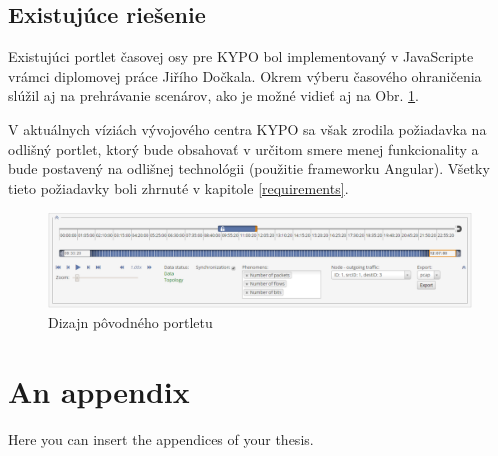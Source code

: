 \documentclass[
  digital, %
  twoside, %
  notable,   %
  nolof,   %
  nolot,   %
]{fithesis3}
\begin{document}
\section{Existujúce riešenie}
Existujúci portlet časovej osy pre KYPO bol implementovaný v JavaScripte vrámci diplomovej práce Jiřího Dočkala\cite{dockal2016webovy}. Okrem výberu časového ohraničenia slúžil aj na prehrávanie scenárov, ako je možné vidieť aj na Obr. \ref{old_portlet}.

V aktuálnych víziách vývojového centra KYPO sa však zrodila požiadavka na odlišný portlet, ktorý bude obsahovať v určitom smere menej funkcionality a bude postavený na odlišnej technológii (použitie frameworku Angular). Všetky tieto požiadavky boli zhrnuté v kapitole \ref{requirements}.
\begin{figure}
	\center
	\includegraphics[width=1.0\linewidth]{old_portlet}
	\caption{Dizajn pôvodného portletu\cite{dockal2016webovy}}
	\label{old_portlet}
\end{figure}


\printbibliography[heading=bibintoc] %

  \makeatletter\thesis@blocks@clear\makeatother
  \printindex

\appendix %
\chapter{An appendix}
Here you can insert the appendices of your thesis.
\end{document}
